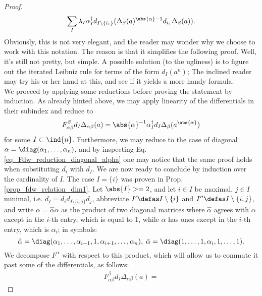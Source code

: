 \begin{cor}
\begin{proof}
\begin{equation*}
	\sum_I \lambda_I \alpha^\dagger_I d_{I \setminus \{i_1\}}
    (\Delta_{\beta}(a)^{\abs{\alpha}-1} d_{i_1} \Delta_{\beta}(a)).
\end{equation*}
Obviously, this is not very elegant, and the reader may wonder why we choose to work with this notation. The reason is that it simplifies the following proof. Well, it's still not pretty, but simple. A possible solution (to the ugliness) is to figure out the iterated Leibniz rule for terms of the form $d_I (a^n)$; The inclined reader may try his or her hand at this, and see if it yields a more handy formula. \\
We proceed by applying some reductions before proving the statement by induction. As already hinted above, we may apply linearity of the differentials in their subindex and reduce to
\begin{equation*}
  F_{\alpha\beta}^\beta d_I \Delta_{\alpha\beta} (a) =%
  \abs{\alpha}^{-1}\alpha^\dagger_I d_I \Delta_{\beta}(a^{\abs{\alpha}})%
\end{equation*}
for some $I \subset \ind{n}$. Furthermore, we may reduce to the case of diagonal $\alpha = \diag(\alpha_1, \ldots, \alpha_n)$, and by inspecting Eq. \ref{eq_Fdw_reduction_diagonal_alpha} one may notice that the same proof holds when substituting $d_i$ with $d_I$. We are now ready to conclude by induction over the cardinality of $I$. The case $I = \{i\}$ was proven in Prop. \ref{prop_fdw_relation_dim1}. Let $\abs{I} >= 2$, and let $i \in I$ be maximal, $j\in I$ minimal, i.e. $d_I = d_i d_{I \setminus \{i,j\}} d_j$, abbreviate $I^\prime \defas I \setminus \{i\}$ and $I^{\prime\prime} \defas I \setminus \{i,j\}$, and write $\alpha = \hat \alpha \bar \alpha$ as the product of two diagonal matrices where $\hat \alpha$ agrees with $\alpha$ except in the $i$-th entry, which is equal to $1$, while $\bar \alpha$ has ones except in the $i$-th entry, which is $\alpha_i$; in symbols:
\begin{equation*}
	\hat \alpha = \diag(\alpha_1, \ldots, \alpha_{i-1}, 1, \alpha_{i+1}, \ldots, \alpha_n),\;%
		\bar \alpha = \diag(1,\ldots,1,\alpha_i,1,\ldots,1).
\end{equation*}
We decompose $F^\alpha$ with respect to this product, which will allow us to commute it past some of the differentials, as follows:\\
\begin{gather*}
	F_{\alpha\beta}^\beta d_I \Delta_{\alpha\beta}(a) = %

\end{gather*}
\end{proof}
\end{cor}
